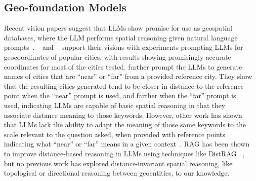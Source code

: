 \subsection{Geo-foundation Models}
Recent vision papers suggest that LLMs show promise for use as geospatial databases, where the LLM performs spatial reasoning given natural language prompts~\cite{Bhandari2023, Qi2023}.
\citeauthor{Bhandari2023}~\cite{Bhandari2023} and \citeauthor{Qi2023}~\cite{Qi2023} support their visions with experiments prompting LLMs for geocoordinates of popular cities, with results showing promisingly accurate coordinates for most of the cities tested.
\citeauthor{Bhandari2023} further prompt the LLMs to generate names of cities that are ``near'' or ``far'' from a provided reference city.
They show that the resulting cities generated tend to be closer in distance to the reference point when the ``near'' prompt is used, and farther when the ``far'' prompt is used, indicating LLMs are capable of basic spatial reasoning in that they associate distance meaning to those keywords.
However, other work has shown that LLMs lack the ability to adapt the meaning of those same keywords to the scale relevant to the question asked, when provided with reference points indicating what ``near'' or ``far'' means in a given context~\cite{Osullivan2024}.
RAG has been shown to improve distance-based reasoning in LLMs using techniques like DistRAG~\cite{} , but no previous work has explored distance-invariant spatial reasoning, like topological or directional reasoning between geoentities, to our knowledge.

